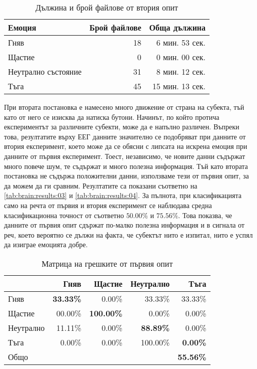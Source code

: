 \documentclass[main.tex]{subfiles}
\begin{document}
\begin{table}[h]
    \begin{center}
    \begin{tabular}{|l|r|r|} 
        \hline
        Емоция & Брой файлове & Обща дължина\\ 
        \hline
        Гняв & 18 & 6 мин. 53 сек.\\ 
        Щастие & 0 & 0 мин. 00 сек. \\ 
        Неутрално състояние & 31 & 8 мин. 12 сек. \\ 
        Тъга & 45 & 15 мин. 13 сек. \\ 
        \hline
    \end{tabular}
    \caption{Дължина и брой файлове от втория опит}
    \label{tab:brain:results:02}
    \end{center}
\end{table}

При втората постановка е намесено много движение от страна на субекта, тъй като от него се изисква да натиска бутони. Начинът, по който протича експериментът за различните субекти, може да е напълно различен. Въпреки това, резултатите върху ЕЕГ данните значително се подобряват при данните от втория експеримент, което може да се обясни с липсата на искрена емоция при данните от първия експеримент. Тоест, независимо, че новите данни съдържат много повече шум, те съдържат и много полезна информация. 
Тъй като втората постановка не съдържа положителни данни, използваме тези от първия опит, за да можем да ги сравним. Резултатите са показани съответно на \autoref{tab:brain:results:03} и \autoref{tab:brain:results:04}. За пълнота, при класификацията само на речта от първия и втория експеримент се наблюдава средна класификационна точност от съответно $50.00\%$ и $75.56\%$. Това показва, че данните от първия опит сдържат по-малко полезна информация и в сигнала от реч, което вероятно се дължи на факта, че субектът нито е изпитал, нито е успял да изиграе емоцията добре.


\begin{table}[h]
    \begin{center}
    \begin{tabular}{|l|r r r r|} 
        \hline
        & Гняв & Щастие & Неутрално & Тъга \\ 
        \hline
        Гняв &  \textbf{33.33\%} & 0.00\% & 33.33\% & 33.33\% \\ 
        Щастие & 00.00\% & \textbf{100.00\%} & 0.00\% & 0.00\% \\ 
        Неутрално & 11.11\% & 0.00\% & \textbf{88.89\%} & 0.00\% \\ 
        Тъга & 0.00\% & 0.00\% & 100.00\% & \textbf{0.00\%}\\ 
        \hline
        \hline
        Общо & & & & \textbf{55.56\%}\\
        \hline
    \end{tabular}
    \caption{Матрица на грешките от първия опит}
    \label{tab:brain:results:03}
    \end{center}
\end{table}
\end{document}
